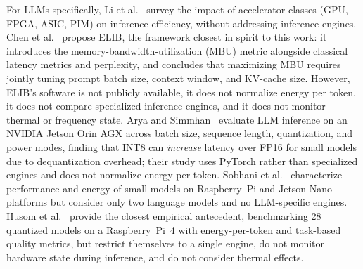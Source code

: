 \documentclass[acmsmall,natbib=false]{acmart}
\begin{document}
For LLMs specifically, Li et al.~\cite{li_large_2025} survey the impact of
accelerator classes (GPU, FPGA, ASIC, PIM) on inference efficiency, without
addressing inference engines. Chen et al.~\cite{chen_inference_2025} propose
ELIB, the framework closest in spirit to this work: it introduces the
memory-bandwidth-utilization (MBU) metric alongside classical latency metrics
and perplexity, and concludes that maximizing MBU requires jointly tuning
prompt batch size, context window, and KV-cache size. However, ELIB's
software is not publicly available, it does not normalize energy per token,
it does not compare specialized inference engines, and it does not monitor
thermal or frequency state. Arya and Simmhan~\cite{11105796} evaluate LLM
inference on an NVIDIA Jetson Orin AGX across batch size, sequence length,
quantization, and power modes, finding that INT8 can \emph{increase} latency
over FP16 for small models due to dequantization overhead; their study uses
PyTorch rather than specialized engines and does not normalize energy per
token. Sobhani et al.~\cite{sobhani_sustainability_2025} characterize
performance and energy of small models on Raspberry~Pi and Jetson Nano
platforms but consider only two language models and no LLM-specific engines.
Husom et al.~\cite{husom_sustainable_2025} provide the closest empirical
antecedent, benchmarking 28 quantized models on a Raspberry~Pi~4 with
energy-per-token and task-based quality metrics, but restrict themselves to a
single engine, do not monitor hardware state during inference, and do not
consider thermal effects.
\end{document}
